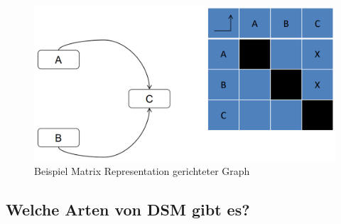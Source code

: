 \begin{figure}[H]
    \centering
    \includegraphics[width=0.6\linewidth]{Bilder/Teil3_MatrixRepresentationGerichtet.png}
    \caption{Beispiel Matrix Representation gerichteter Graph}
\end{figure}


\subsection{Welche Arten von DSM gibt es?}

